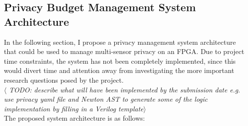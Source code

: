 \documentclass[12pt]{article}
\begin{document}
  \subsection{Privacy Budget Management System Architecture}
    In the following section, I propose a privacy management system architecture that could be used to manage multi-sensor privacy on an FPGA. Due to project time constraints, the system has not been completely implemented, since this would divert time and attention away from investigating the more important research questions posed by the project.
    \\
    \textit{$\langle$ TODO: describe what will have been implemented by the submission date e.g. use privacy yaml file and Newton AST to generate some of the logic implementation by filling in a Verilog template$\rangle$}
    \\
    The proposed system architecture is as follows:
\end{document}
